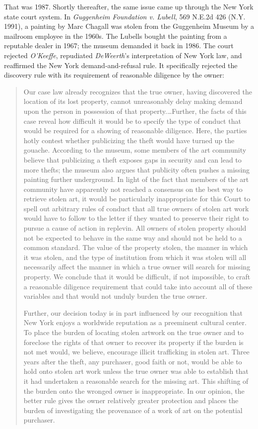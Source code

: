 That was 1987. Shortly thereafter, the same issue came up through the New York
state court system. In \textit{Guggenheim Foundation v. Lubell}, 569 N.E.2d 426
(N.Y. 1991), a painting by Marc Chagall was stolen from the Guggenheim Museum
by a mailroom employee in the 1960s. The Lubells bought the painting from a
reputable dealer in 1967; the museum demanded it back in 1986. The court
rejected \textit{O'Keeffe}, repudiated \textit{DeWeerth}{}'s interpretation of
New York law, and reaffirmed the New York demand-and-refusal rule. It
specifically rejected the discovery rule with its requirement of reasonable
diligence by the owner:
\begin{quotation}
Our case law already recognizes that the true owner, having discovered the
location of its lost property, cannot unreasonably delay making demand upon the
person in possession of that property.\dots Further, the facts of this case
reveal how difficult it would be to specify the type of conduct that would be
required for a showing of reasonable diligence. Here, the parties hotly contest
whether publicizing the theft would have turned up the gouache. According to
the museum, some members of the art community believe that publicizing a theft
exposes gaps in security and can lead to more thefts; the museum also argues
that publicity often pushes a missing painting further underground. In light of
the fact that members of the art community have apparently not reached a
consensus on the best way to retrieve stolen art, it would be particularly
inappropriate for this Court to spell out arbitrary rules of conduct that all
true owners of stolen art work would have to follow to the letter if they
wanted to preserve their right to pursue a cause of action in replevin. All
owners of stolen property should not be expected to behave in the same way and
should not be held to a common standard. The value of the property stolen, the
manner in which it was stolen, and the type of institution from which it was
stolen will all necessarily affect the manner in which a true owner will search
for missing property. We conclude that it would be difficult, if not
impossible, to craft a reasonable diligence requirement that could take into
account all of these variables and that would not unduly burden the true owner.

Further, our decision today is in part influenced by our recognition that New
York enjoys a worldwide reputation as a preeminent cultural center. To place
the burden of locating stolen artwork on the true owner and to foreclose the
rights of that owner to recover its property if the burden is not met would, we
believe, encourage illicit trafficking in stolen art. Three years after the
theft, any purchaser, good faith or not, would be able to hold onto stolen art
work unless the true owner was able to establish that it had undertaken a
reasonable search for the missing art. This shifting of the burden onto the
wronged owner is inappropriate. In our opinion, the better rule gives the owner
relatively greater protection and places the burden of investigating the
provenance of a work of art on the potential purchaser.
\end{quotation}
